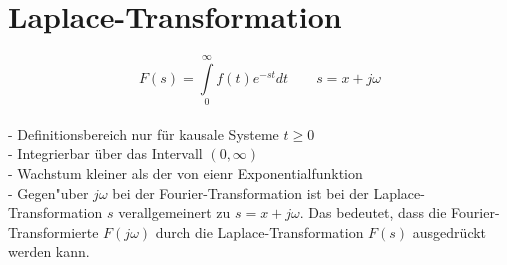 \section{Laplace-Transformation}
	$$\boxed{F(s)=\int\limits_0^\infty f(t)e^{-st}dt} \qquad s=x+j\omega$$\\
	- Definitionsbereich nur für kausale Systeme $t\geq 0$\\
	- Integrierbar über das Intervall $(0,\infty)$\\
	- Wachstum kleiner als der von eienr Exponentialfunktion\\ 
	- Gegen"uber $j\omega$ bei der Fourier-Transformation ist bei der
	Laplace-Transformation $s$ verallgemeinert zu $s=x + j\omega$. Das
	bedeutet, dass die Fourier-Transformierte $F(j\omega)$ durch die
	Laplace-Transformation $F(s)$ ausgedr\"uckt werden kann.  	
  
